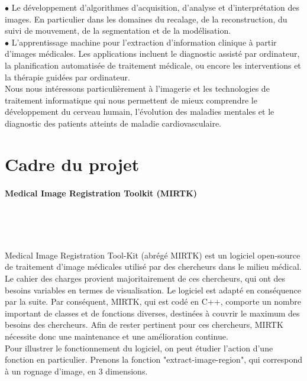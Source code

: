 \documentclass[10pt]{report}
\begin{document}
	{$\bullet$} Le développement d'algorithmes d'acquisition, d'analyse et d'interprétation des images. En particulier dans les domaines du recalage, de la reconstruction,
	du suivi de mouvement, de la segmentation et de la modélisation. \\

	{$\bullet$} L'apprentissage machine pour l'extraction d'information clinique à partir
	d'images médicales. Les applications incluent le diagnostic assisté par
	ordinateur, la planification automatisée de traitement médicale, ou encore les
	interventions et la thérapie guidées par ordinateur. \\

	Nous nous intéressons particulièrement à l'imagerie et les technologies de
	traitement informatique qui nous permettent de mieux comprendre le
	développement du cerveau humain, l’évolution des maladies mentales et le
	diagnostic des patients atteints de maladie cardiovasculaire.
	
	
	\section{Cadre du projet} %
	\paragraph{Medical Image Registration Toolkit (MIRTK)}~\par~\par
	Medical Image Registration Tool-Kit (abrégé MIRTK) est un logiciel open-source de traitement d'image médicales utilisé par des chercheurs dans le milieu médical. Le cahier des charges provient majoritairement de ces chercheurs, qui ont des besoins variables en termes de visualisation. Le logiciel est adapté en conséquence par la suite. Par conséquent, MIRTK, qui est codé en C++, comporte un nombre important de classes et de fonctions diverses, destinées à couvrir le maximum des besoins des chercheurs.
	Afin de rester pertinent pour ces chercheurs, MIRTK nécessite donc une maintenance et une amélioration continue.\\
	Pour illustrer le fonctionnement du logiciel, on peut étudier l'action d'une fonction en particulier. Prenons la fonction "extract-image-region", qui correspond à un rognage d'image, en 3 dimensions.
\end{document}
